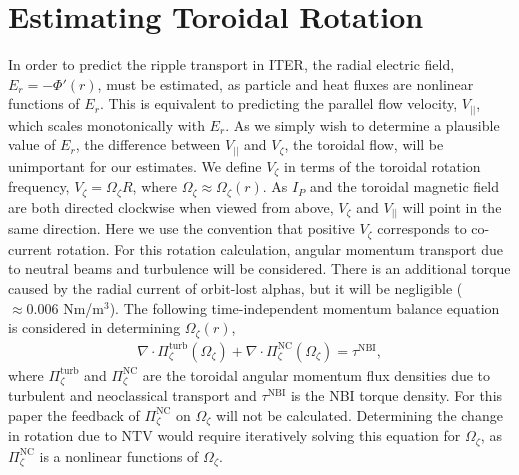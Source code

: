 \documentclass[aip, pop, preprint]{revtex4-1}
\numberwithin{figure}{section}
\numberwithin{equation}{section}
\begin{document}
\FloatBarrier

\section{Estimating Toroidal Rotation}\label{rotation}

In order to predict the ripple transport in ITER, the radial electric field, $E_r = - \Phi'(r) $, must be estimated, as particle and heat fluxes are nonlinear functions of $E_r$. This is equivalent to predicting the parallel flow velocity, $V_{||}$, which scales monotonically with $E_r$.  As we simply wish to determine a plausible value of $E_r$, the difference between $V_{||}$ and $V_{\zeta}$, the toroidal flow, will be unimportant for our estimates. We define $V_{\zeta}$ in terms of the toroidal rotation frequency, $V_{\zeta} = \Omega_{\zeta} R$, where $\Omega_{\zeta} \approx \Omega_{\zeta}(r)$. As $I_P$ and the toroidal magnetic field are both directed clockwise when viewed from above, $V_{\zeta}$ and $V_{||}$ will point in the same direction. Here we use the convention that positive $V_{\zeta}$ corresponds to co-current rotation. For this rotation calculation, angular momentum transport due to neutral beams and turbulence will be considered. There is an additional torque caused by the radial current of orbit-lost alphas,\cite{Rosenbluth1996} but it will be negligible ($\approx 0.006$ Nm/m$^3$). The following time-independent momentum balance equation is considered in determining $\Omega_{\zeta}(r)$,
\begin{gather}
\nabla \cdot \Pi_{\zeta}^{\text{turb}}(\Omega_{\zeta}) + \nabla \cdot \Pi_{\zeta}^{\text{NC}}(\Omega_{\zeta}) = \tau^{\text{NBI}},
\end{gather}
where $\Pi^{\text{turb}}_{\zeta}$ and $\Pi^{\text{NC}}_{\zeta}$ are the toroidal angular momentum flux densities due to turbulent and neoclassical transport and $\tau^{\text{NBI}}$ is the NBI torque density. For this paper the feedback of $\Pi_{\zeta}^{\text{NC}}$ on $\Omega_{\zeta}$ will not be calculated. Determining the change in rotation due to NTV would require iteratively solving this equation for $\Omega_{\zeta}$, as $\Pi_{\zeta}^{\text{NC}}$ is a nonlinear functions of $\Omega_{\zeta}$. 
\end{document}
